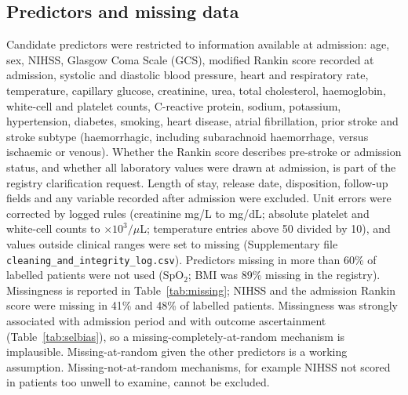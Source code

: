 \documentclass[preprint,10pt]{elsarticle}
\begin{document}
\subsection{Predictors and missing data}
\label{sec:missing}
Candidate predictors were restricted to information available at admission: age, sex, NIHSS, Glasgow Coma Scale (GCS), modified Rankin score recorded at admission, systolic and diastolic blood pressure, heart and respiratory rate, temperature, capillary glucose, creatinine, urea, total cholesterol, haemoglobin, white-cell and platelet counts, C-reactive protein, sodium, potassium, hypertension, diabetes, smoking, heart disease, atrial fibrillation, prior stroke and stroke subtype (haemorrhagic, including subarachnoid haemorrhage, versus ischaemic or venous). Whether the Rankin score describes pre-stroke or admission status, and whether all laboratory values were drawn at admission, is part of the registry clarification request. Length of stay, release date, disposition, follow-up fields and any variable recorded after admission were excluded. Unit errors were corrected by logged rules (creatinine mg/L to mg/dL; absolute platelet and white-cell counts to $\times10^3/\mu$L; temperature entries above 50 divided by 10), and values outside clinical ranges were set to missing (Supplementary file \texttt{cleaning\_and\_integrity\_log.csv}). Predictors missing in more than 60\% of labelled patients were not used (SpO$_2$; BMI was 89\% missing in the registry). Missingness is reported in Table~\ref{tab:missing}; NIHSS and the admission Rankin score were missing in 41\% and 48\% of labelled patients. Missingness was strongly associated with admission period and with outcome ascertainment (Table~\ref{tab:selbias}), so a missing-completely-at-random mechanism is implausible. Missing-at-random given the other predictors is a working assumption. Missing-not-at-random mechanisms, for example NIHSS not scored in patients too unwell to examine, cannot be excluded.
\end{document}
